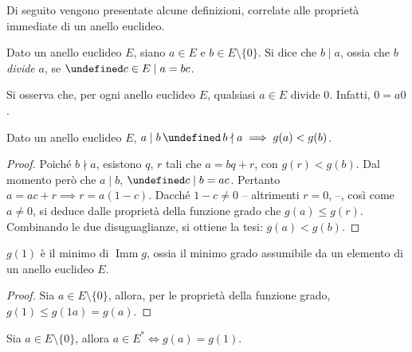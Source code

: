 \documentclass[a4paper]{article}
\DeclareMathOperator{\Imm}{Imm}
\let\oldexists\exists
\let\exists\undefined
\DeclareMathOperator{\exists}{\oldexists}
\let\oldland\land
\let\land\undefined
\DeclareMathOperator{\land}{\oldland}
\begin{document}
Di seguito vengono presentate alcune definizioni, correlate
alle proprietà immediate di un anello euclideo.

\begin{definition}
    Dato un anello euclideo $E$, siano $a \in E$ e $b \in E \setminus \{0\}$. Si dice che
    $b \mid a$, ossia che $b$ \textit{divide} $a$, se $\exists c \in E \mid
        a=bc$.
\end{definition}

\begin{note}
    Si osserva che, per ogni anello euclideo $E$, qualsiasi $a \in E$ divide
    $0$. Infatti, $0 = a0$.
\end{note}

\begin{proposition}
    Dato un anello euclideo $E$, $a \mid b \,\land\, b \nmid a \implies g(a) < g(b)$.
\end{proposition}

\begin{proof}
    Poiché $b \nmid a$, esistono $q$, $r$ tali che $a = bq + r$, con
    $g(r) < g(b)$. Dal momento però che $a \mid b$, $\exists c \mid
        b = ac$. Pertanto $a = ac + r \implies r = a(1-c)$. Dacché $1-c \neq 0$ --
    altrimenti $r=0$, \Lightning{} --, così come $a \neq 0$, si deduce
    dalle proprietà della funzione grado che $g(a) \leq g(r)$.
    Combinando le due disuguaglianze, si ottiene la
    tesi: $g(a) < g(b)$.
\end{proof}

\begin{proposition}
    \label{prop:g1_minimo}
    $g(1)$ è il minimo di $\Imm g$, ossia il minimo grado assumibile
    da un elemento di un anello euclideo $E$.
\end{proposition}

\begin{proof}
    Sia $a \in E \setminus \{0\}$, allora, per le proprietà della funzione
    grado, $g(1) \leq g(1a) = g(a)$.
\end{proof}

\begin{theorem}
    Sia $a \in E \setminus \{0\}$, allora $a \in E^* \iff g(a) = g(1)$.
\end{theorem}
\end{document}
